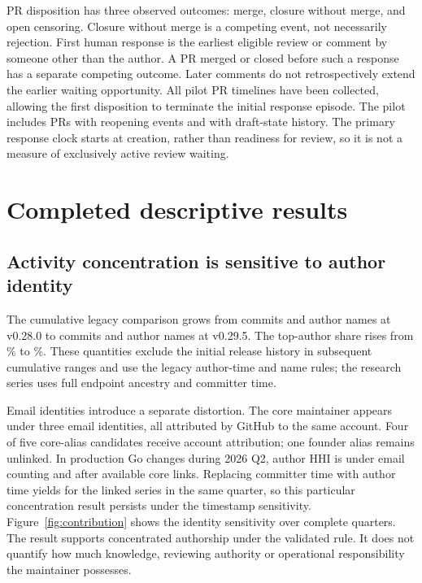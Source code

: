 \documentclass[11pt]{article}
\begin{document}
PR disposition has three observed outcomes: merge, closure without merge,
and open censoring. Closure without merge is a competing event, not necessarily
rejection. First human response is the earliest eligible review or comment by
someone other than the author. A PR merged or closed before such a response
has a separate competing outcome. Later comments do not retrospectively extend
the earlier waiting opportunity. All pilot PR timelines have been collected,
allowing the first disposition to terminate the initial response episode.
The pilot includes \PilotReopenedPRs{} PRs with reopening events and
\PilotDraftHistoryPRs{} with draft-state history. The primary response clock
starts at creation, rather than readiness for review, so it is not a measure
of exclusively active review waiting.

\section{Completed descriptive results}
\subsection{Activity concentration is sensitive to author identity}
The cumulative legacy comparison grows from \OldCommitCount{} commits and
\OldAuthorCount{} author names at v0.28.0 to \NewCommitCount{} commits and
\NewAuthorCount{} author names at v0.29.5. The top-author share rises from
\OldTopAuthor{}\% to \NewTopAuthor{}\%. These quantities exclude the initial
release history in subsequent cumulative ranges and use the legacy author-time
and name rules; the research series uses full endpoint ancestry and committer time.

Email identities introduce a separate distortion. The core maintainer appears
under three email identities, all attributed by GitHub to the same account.
Four of five core-alias candidates receive account attribution; one founder
alias remains unlinked. In production Go changes during 2026 Q2, author HHI
is \QuarterRawHHI{} under email counting and \QuarterLinkedHHI{} after available
core links. Replacing committer time with author time yields
\QuarterAuthorClockHHI{} for the linked series in the same quarter, so this
particular concentration result persists under the timestamp sensitivity.
Figure~\ref{fig:contribution} shows the identity sensitivity over
complete quarters. The result supports concentrated authorship under the
validated rule. It does not quantify how much knowledge, reviewing authority
or operational responsibility the maintainer possesses.
\end{document}
